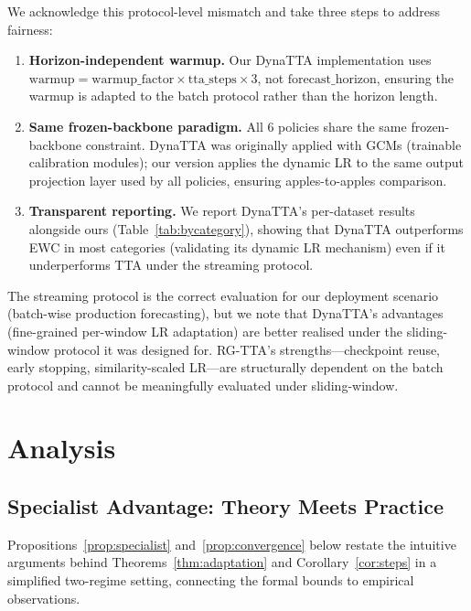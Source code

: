 \documentclass[11pt,a4paper]{article}
\begin{document}
We acknowledge this protocol-level mismatch and take three steps to address fairness:

\begin{enumerate}[nosep]
  \item \textbf{Horizon-independent warmup.} Our DynaTTA implementation uses $\text{warmup} = \text{warmup\_factor} \times \text{tta\_steps} \times 3$, not $\text{forecast\_horizon}$, ensuring the warmup is adapted to the batch protocol rather than the horizon length.
  \item \textbf{Same frozen-backbone paradigm.} All 6 policies share the same frozen-backbone constraint. DynaTTA was originally applied with GCMs (trainable calibration modules); our version applies the dynamic LR to the same output projection layer used by all policies, ensuring apples-to-apples comparison.
  \item \textbf{Transparent reporting.} We report DynaTTA's per-dataset results alongside ours (Table~\ref{tab:bycategory}), showing that DynaTTA outperforms EWC in most categories (validating its dynamic LR mechanism) even if it underperforms TTA under the streaming protocol.
\end{enumerate}

The streaming protocol is the correct evaluation for our deployment scenario (batch-wise production forecasting), but we note that DynaTTA's advantages (fine-grained per-window LR adaptation) are better realised under the sliding-window protocol it was designed for. RG-TTA's strengths---checkpoint reuse, early stopping, similarity-scaled LR---are structurally dependent on the batch protocol and cannot be meaningfully evaluated under sliding-window.


\section{Analysis}
\label{sec:analysis}

\subsection{Specialist Advantage: Theory Meets Practice}

Propositions~\ref{prop:specialist} and~\ref{prop:convergence} below restate the intuitive arguments behind Theorems~\ref{thm:adaptation} and Corollary~\ref{cor:steps} in a simplified two-regime setting, connecting the formal bounds to empirical observations.
\end{document}
